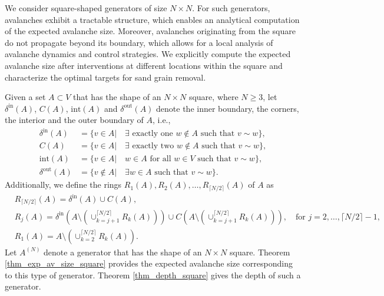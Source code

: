 \documentclass{article}
\begin{document}
We consider square-shaped generators of size $N \times N$. For such generators, avalanches exhibit a tractable structure, which enables an analytical computation of the expected avalanche size. Moreover, avalanches originating from the square do not propagate beyond its boundary, which allows for a local analysis of avalanche dynamics and control strategies. We explicitly compute the expected avalanche size after interventions at different locations within the square and characterize the optimal targets for sand grain removal. %

Given a set $A \subset V$ that has the shape of an $N \times N$ square, where $N \geq 3$, let $\delta^{\text{in}}(A)$, $C(A)$, $\text{int}(A)$ and $\delta^{\text{out}}(A)$ denote the inner boundary, the corners, the interior and the outer boundary of $A$, i.e., 
    \begin{align*}
        \delta^{\text{in}}(A) &= \{v \in A|\quad \exists \text{ exactly one } w \notin A \text{ such that } v \sim w\}, \\
        C(A) &= \{v \in A|\quad \exists \text{ exactly two } w \notin A \text{ such that } v \sim w\}, \\
        \text{int}(A) &= \{v \in A| \quad w \in A \text{ for all } w \in V \text{ such that } v \sim w\}, \\
        \delta^{\text{out}}(A) &= \{v \notin A|\quad \exists w \in A \text{ such that } v \sim w\}.
    \end{align*} 
Additionally, we define the rings $R_1(A), R_2(A), \ldots, R_{\lceil N/2 \rceil}(A)$ of $A$ as
\begin{align*}
    &R_{\lceil N/2 \rceil}(A) = \delta^{\text{in}}(A) \cup C(A), \\
    &R_j(A) = \delta^{\text{in}}(A \setminus (\cup_{k = j+1}^{\lceil N/2 \rceil}R_k(A))) \cup C(A \setminus (\cup_{k = j+1}^{\lceil N/2 \rceil}R_k(A))), \quad \text{for } j = 2, \ldots, \lceil N/2 \rceil -1,\\
    &R_1(A) = A \setminus (\cup_{k = 2}^{\lceil N/2 \rceil}R_k(A)).
\end{align*}
Let $A^{(N)}$ denote a generator that has the shape of an $N \times N$ square. Theorem \ref{thm_exp_av_size_square} provides the expected avalanche size corresponding to this type of generator. Theorem \ref{thm_depth_square} gives the depth of such a generator. 
\end{document}
